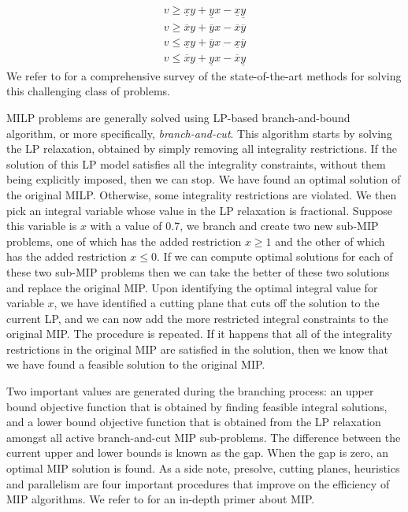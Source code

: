 \[\begin{array}{l}
v \geq \underline{x}y + \underline{y}x - \underline{x}\underline{y}\\
v \geq \overline{x}y + \overline{y}x - \overline{x}\overline{y}\\
v \leq \underline{x}y + \overline{y}x - \underline{x}\overline{y}\\
v \leq \overline{x}y + \underline{y}x - \overline{x}\underline{y}
\end{array}
\]
We refer to \cite{belotti2013mixed} for a comprehensive survey of the state-of-the-art methods for solving this challenging class of problems.

MILP problems are generally solved using LP-based branch-and-bound algorithm, or more specifically, \textsl{branch-and-cut}. This algorithm starts by solving the LP relaxation, obtained by simply removing all integrality restrictions. If the solution of this LP model satisfies all the integrality constraints, without them being explicitly imposed, then we can stop. We have found an optimal solution of the original MILP. Otherwise, some integrality restrictions are violated. We then pick an integral variable whose value in the LP relaxation is fractional. Suppose this variable is $x$ with a value of 0.7, we branch and create two new sub-MIP problems, one of which has the added restriction $x \geq 1$ and the other of which has the added restriction $x \leq 0$. If we can compute optimal solutions for each of these two sub-MIP problems then we can take the better of these two solutions and replace the original MIP. Upon identifying the optimal integral value for variable $x$, we have identified a cutting plane that cuts off the solution to the current LP, and we can now add the more restricted integral constraints to the original MIP. The procedure is repeated. If it happens that all of the integrality restrictions in the original MIP are satisfied in the solution, then we know that we have found a feasible solution to the original MIP. 

Two important values are generated during the branching process: an upper bound objective function that is obtained by finding feasible integral solutions, and a lower bound objective function that is obtained from the LP relaxation amongst all active branch-and-cut MIP sub-problems. The difference between the current upper and lower bounds is known as the gap. When the gap is zero, an optimal MIP solution is found. %
As a side note, presolve, cutting planes, heuristics and parallelism are four important procedures that improve on the efficiency of MIP algorithms. We refer to \cite{gurobi16mip} for an in-depth primer about MIP.


